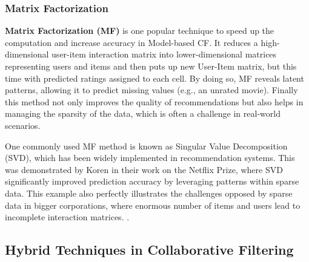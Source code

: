 \documentclass[10pt,a4paper]{article}
\begin{document}
\hspace{0.1cm}

\subsubsection{Matrix Factorization}
\textbf{Matrix Factorization (MF)} is one popular technique to speed up the computation and increase accuracy in Model-based CF. It reduces a high-dimensional user-item interaction matrix into lower-dimensional matrices representing users and items and then puts up new User-Item matrix, but this time with predicted ratings assigned to each cell. By doing so, MF reveals latent patterns, allowing it to predict missing values (e.g., an unrated movie). Finally this method not only improves the quality of recommendations but also helps in managing the sparsity of the data, which is often a challenge in real-world scenarios.
\cite{matrixfactorization}

\hspace{0.1cm}

One commonly used MF method is known as Singular Value Decomposition (SVD), which has been widely implemented in recommendation systems. This was demonstrated by Koren in their work on the Netflix Prize, where SVD significantly improved prediction accuracy by leveraging patterns within sparse data. This example also perfectly illustrates the challenges opposed by sparse data in bigger corporations, where enormous number of items and users lead to incomplete interaction matrices. \cite{koren2009matrix}\cite{koren2009bellkor}.

\hspace{0.1cm}

\subsection{Hybrid Techniques in Collaborative Filtering} 

\label{sec:types_of_collaborative_filtering}



\end{document}
